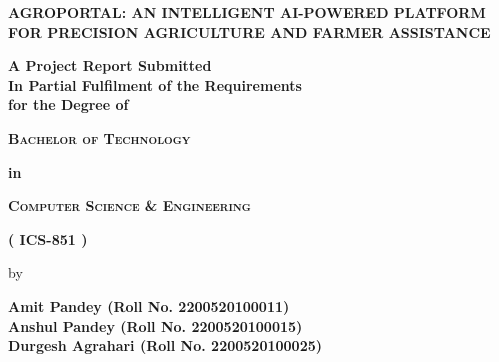 
\thispagestyle{empty}
\singlespacing
\begin{titlepage}

\begin{center}
    \centering

  {{\LARGE \textbf{AGROPORTAL: AN INTELLIGENT AI-POWERED PLATFORM\\[0.3cm] FOR PRECISION AGRICULTURE AND FARMER ASSISTANCE}\par}}
    \vspace{0.8cm}

  \vspace{0.4cm}
    \textbf{ {A Project Report Submitted\\ In Partial Fulfilment of the Requirements\\ for the Degree of \\}}
    \vspace{0.8cm}
    {
   \textsc{\textbf{\large Bachelor of Technology\\}} \par}
   \textbf{\Large in\\} \par
   \textsc{\textbf{\large Computer Science \& Engineering}} \par
    \vspace{0.3cm}

    {\textbf{( ICS-851 )}} \\
    \vspace{0.5cm}


    {\large by\par}
    \vspace{0.3cm}
    {\textbf{{Amit Pandey} (Roll No. 2200520100011)}}\\
    {\textbf{{Anshul Pandey} (Roll No. 2200520100015)}}\\
    {\textbf{{Durgesh Agrahari} (Roll No. 2200520100025)}}\\
    \vspace{1.2cm}


\end{center}
\end{titlepage}
